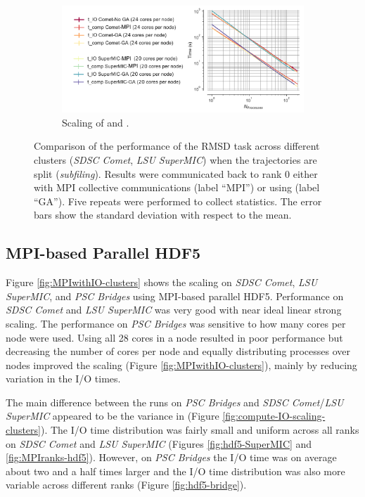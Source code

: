 \begin{figure}[!htb]
  \begin{subfigure}{0.7\textwidth}
    \includegraphics[width=\linewidth]{figures/Clusters_IO_compute_scaling_splitting_edited.pdf}
    \captionsetup{format=hang}
    \caption{Scaling of \tcomp and \tIO.}
    \label{fig:compute-IO-scaling-clusters-splitting}
  \end{subfigure}
  \caption{Comparison of the performance of the RMSD task across different clusters (\emph{SDSC Comet}, \emph{LSU SuperMIC}) when the trajectories are split (\emph{subfiling}).
    Results were communicated back to rank 0 either with MPI collective communications (label ``MPI'') or using  (label ``GA'').
    Five repeats were performed to collect statistics.
    The error bars show the standard deviation with respect to the mean.}
\label{fig:MPI-splitting-clusters}
\end{figure} 

\subsection{MPI-based Parallel HDF5}

Figure \ref{fig:MPIwithIO-clusters} shows the scaling on \emph{SDSC Comet}, \emph{LSU SuperMIC}, and \emph{PSC Bridges} using MPI-based parallel HDF5.  
Performance on \emph{SDSC Comet} and \emph{LSU SuperMIC} was very good with near ideal linear strong scaling.
The performance on \emph{PSC Bridges} was sensitive to how many cores per node were used.
Using all 28 cores in a node resulted in poor performance but decreasing the number of cores per node and equally distributing processes over nodes improved the scaling (Figure \ref{fig:MPIwithIO-clusters}), mainly by reducing variation in the I/O times.

The main difference between the runs on \emph{PSC Bridges} and \emph{SDSC Comet}/\emph{LSU SuperMIC} appeared to be the variance in \tIO (Figure \ref{fig:compute-IO-scaling-clusters}).
The I/O time distribution was fairly small and uniform across all ranks on \emph{SDSC Comet} and \emph{LSU SuperMIC} (Figures \ref{fig:hdf5-SuperMIC} and \ref{fig:MPIranks-hdf5}).
However, on \emph{PSC Bridges} the I/O time was on average about two and a half times larger and the I/O time distribution was also more variable across different ranks (Figure \ref{fig:hdf5-bridge}).  

